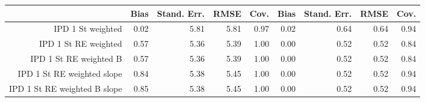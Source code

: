 \begin{table}[ht]
\centering
\begin{tabular}{rrrrrrrrr}
  \toprule
 & Bias & Stand. Err. & RMSE & Cov. & Bias & Stand. Err. & RMSE & Cov. \\ 
  \midrule
IPD 1 St weighted & 0.02 & 5.81 & 5.81 & 0.97 & 0.02 & 0.64 & 0.64 & 0.94 \\ 
  IPD 1 St RE weighted & 0.57 & 5.36 & 5.39 & 1.00 & 0.00 & 0.52 & 0.52 & 0.84 \\ 
  IPD 1 St RE weighted B & 0.57 & 5.36 & 5.39 & 1.00 & 0.00 & 0.52 & 0.52 & 0.84 \\ 
  IPD 1 St RE weighted slope & 0.84 & 5.38 & 5.45 & 1.00 & 0.00 & 0.52 & 0.52 & 0.94 \\ 
  IPD 1 St RE weighted B slope & 0.85 & 5.38 & 5.45 & 1.00 & 0.00 & 0.52 & 0.52 & 0.94 \\ 
   \bottomrule
\end{tabular}
\end{table}
